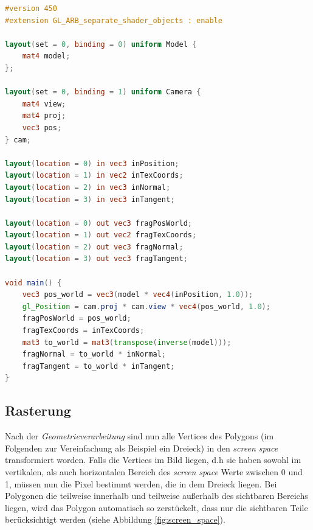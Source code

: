 \documentclass[oneside]{ausarbeitung}
\begin{document}
\begin{minipage}{\textwidth}
\begin{lstlisting}[language=GLSL, label={lst:vertex_shader}, caption={Beispiel eines Vertex Shaders in \ac{GLSL}, welcher so in der \textbf{spider}-Engine verwendet wird}]
#version 450
#extension GL_ARB_separate_shader_objects : enable

layout(set = 0, binding = 0) uniform Model {
    mat4 model;
};

layout(set = 0, binding = 1) uniform Camera {
    mat4 view;
    mat4 proj;
    vec3 pos;
} cam;

layout(location = 0) in vec3 inPosition;
layout(location = 1) in vec2 inTexCoords;
layout(location = 2) in vec3 inNormal;
layout(location = 3) in vec3 inTangent;

layout(location = 0) out vec3 fragPosWorld;
layout(location = 1) out vec2 fragTexCoords;
layout(location = 2) out vec3 fragNormal;
layout(location = 3) out vec3 fragTangent;

void main() {
    vec3 pos_world = vec3(model * vec4(inPosition, 1.0));
    gl_Position = cam.proj * cam.view * vec4(pos_world, 1.0);
    fragPosWorld = pos_world;
    fragTexCoords = inTexCoords;
    mat3 to_world = mat3(transpose(inverse(model)));
    fragNormal = to_world * inNormal;
    fragTangent = to_world * inTangent;
}
\end{lstlisting}
\end{minipage}
\subsection{Rasterung}
\label{sub:rasterizing}
Nach der \textit{Geometrieverarbeitung} sind nun alle Vertices des Polygons (im Folgenden zur Vereinfachung als Beispiel ein Dreieck) in den \textit{screen space} transformiert worden. Falls die Vertices im Bild liegen, d.h sie haben sowohl im vertikalen, als auch horizontalen Bereich des \textit{screen space} Werte zwischen 0 und 1, müssen nun die Pixel bestimmt werden, die in dem Dreieck liegen. Bei Polygonen die teilweise innerhalb und teilweise außerhalb des sichtbaren Bereichs liegen, wird das Polygon automatisch so zerstückelt, dass nur die sichtbaren Teile berücksichtigt werden (siehe Abbildung \ref{fig:screen_space}).
\end{document}
